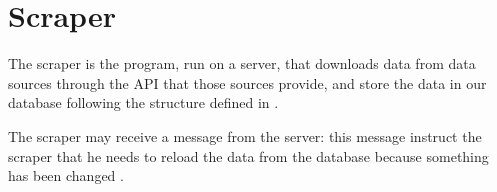 \section{Scraper}\label{sec:scraper}

The scraper is the program, run on a server, that downloads data from data
sources  through the API that those sources
provide, and store the data in our database following the structure defined in
.

The scraper may receive a  message from the server: this message
instruct the scraper that he needs to reload the data from the database because
something has been changed .
